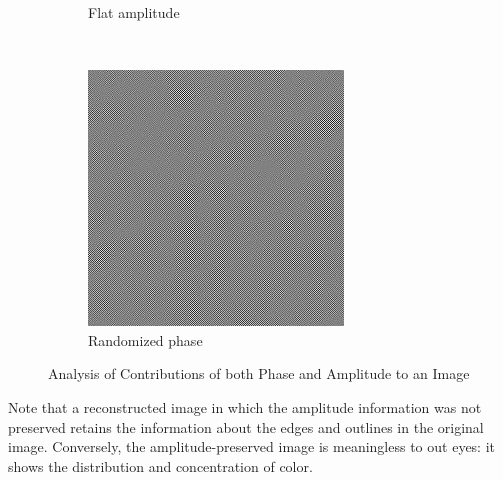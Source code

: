 \documentclass{report}
\begin{document}
\begin{figure}[H]
\begin{subfigure}[b]{0.2\textwidth}
                \caption{Flat amplitude}
                \label{fig:mouse}
        \end{subfigure}
        ~
        \begin{subfigure}[b]{0.2\textwidth}
                \includegraphics[width=\textwidth]{graphics/randomized_phase.jpg}
                \caption{Randomized phase}
                \label{fig:tiger}
        \end{subfigure}
        \caption{Analysis of Contributions of both Phase and Amplitude to an Image}\label{fig:fft_randomization}
\end{figure}
Note that a reconstructed image in which the amplitude information was not preserved retains the information about the edges and outlines in the original image. Conversely, the amplitude-preserved image is meaningless to out eyes: it shows the distribution and concentration of color. 
\end{document}
